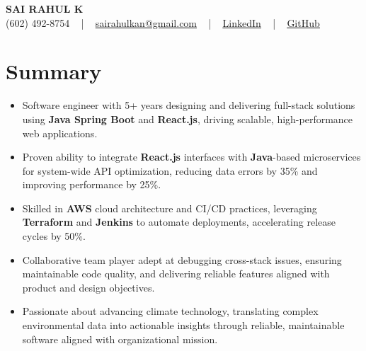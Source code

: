 \documentclass[letterpaper,11pt]{article}
\newcommand{\resumeItem}[1]{
  \item\footnotesize{
    {#1 \vspace{-2pt}}
  }
}
\newcommand{\resumeItemListStart}{\begin{itemize}[leftmargin=*]}
\newcommand{\resumeItemListEnd}{\end{itemize}\vspace{-5pt}}
\begin{document}
\begin{center}
    {\fontsize{14pt}{12pt}\selectfont \textbf{\MakeUppercase{Sai Rahul K}}}\\ \vspace{2pt}
    \fontsize{10pt}{12pt}\selectfont (602) 492-8754 ~ | ~ \href{mailto:sairahulkan@gmail.com}{sairahulkan@gmail.com} ~ | ~
    \href{https://www.linkedin.com/in/rq123/}{\color{blue}\underline{LinkedIn}} ~ | ~
    \href{https://github.com/kanrahuldo}{\color{blue}\underline{GitHub}}~
    \vspace{-8pt}
\end{center}

\section{Summary}
\fontsize{9pt}{10pt}\selectfont
\resumeItemListStart
    \resumeItem{Software engineer with 5+ years designing and delivering full-stack solutions using \textbf{Java Spring Boot} and \textbf{React.js}, driving scalable, high-performance web applications.}
    \resumeItem{Proven ability to integrate \textbf{React.js} interfaces with \textbf{Java}-based microservices for system-wide API optimization, reducing data errors by 35\% and improving performance by 25\%.}
    \resumeItem{Skilled in \textbf{AWS} cloud architecture and CI/CD practices, leveraging \textbf{Terraform} and \textbf{Jenkins} to automate deployments, accelerating release cycles by 50\%.}
    \resumeItem{Collaborative team player adept at debugging cross-stack issues, ensuring maintainable code quality, and delivering reliable features aligned with product and design objectives.}
    \resumeItem{Passionate about advancing climate technology, translating complex environmental data into actionable insights through reliable, maintainable software aligned with organizational mission.}
\resumeItemListEnd
\vspace{-6pt}
\end{document}
